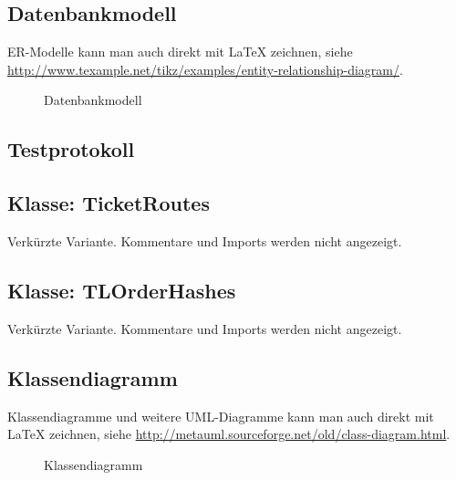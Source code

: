 

\subsection{Datenbankmodell}
\label{app:Datenbankmodell}
ER-Modelle kann man auch direkt mit \LaTeX{} zeichnen, siehe \zB \url{http://www.texample.net/tikz/examples/entity-relationship-diagram/}.
\begin{figure}[htb]
\centering
{}
\caption{Datenbankmodell}
\end{figure}
\clearpage




\subsection{Testprotokoll}
\label{app:test}
\clearpage
{}
\clearpage

\subsection{Klasse: TicketRoutes}
\label{app:CNMI}
Verkürzte Variante. Kommentare und Imports werden nicht angezeigt.

\clearpage

\subsection{Klasse: TLOrderHashes}
\label{app:OrderHashes}
Verkürzte Variante. Kommentare und Imports werden nicht angezeigt.

\clearpage

\subsection{Klassendiagramm}
\label{app:Klassendiagramm}
Klassendiagramme und weitere \acs{UML}-Diagramme kann man auch direkt mit \LaTeX{} zeichnen, siehe \zB \url{http://metauml.sourceforge.net/old/class-diagram.html}.
\begin{figure}[htb]
\centering
{}
\caption{Klassendiagramm}
\end{figure}
\clearpage


